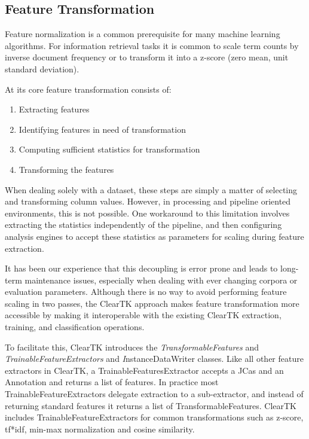 \documentclass[10pt, a4paper]{article}
\begin{document}


\subsection{Feature Transformation}

Feature normalization is a common prerequisite for many machine learning algorithms.  For information retrieval tasks it is common to scale term counts by inverse document frequency or to transform it into a z-score (zero mean, unit standard deviation).

At its core feature transformation consists of:
\begin{enumerate}
\item Extracting features
\item Identifying features in need of transformation
\item Computing sufficient statistics for transformation
\item Transforming the features
\end{enumerate}

When dealing solely with a dataset, these steps are simply a matter of selecting and transforming column values.  However, in processing and pipeline oriented environments, this is not possible.  One workaround to this limitation involves extracting the statistics independently of the pipeline, and then configuring analysis engines to accept these statistics as parameters for scaling during feature extraction.

It has been our experience that this decoupling is error prone and leads to long-term maintenance issues, especially when dealing with ever changing corpora or evaluation parameters.  Although there is no way to avoid performing feature scaling in two passes, the ClearTK approach makes feature transformation more accessible by making it interoperable with the existing ClearTK extraction, training, and classification operations.

To facilitate this, ClearTK introduces the \emph{TransformableFeatures} and \emph{TrainableFeatureExtractors} and {\emph InstanceDataWriter} classes.  Like all other feature extractors in ClearTK, a TrainableFeaturesExtractor accepts a JCas and an Annotation and returns a list of features.  In practice most TrainableFeatureExtractors delegate extraction to a sub-extractor, and instead of returning standard features it returns a list of TransformableFeatures.  ClearTK includes TrainableFeatureExtractors for common transformations such as z-score, tf*idf, min-max normalization and cosine similarity.
\end{document}
